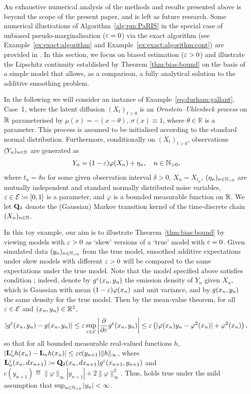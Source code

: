 
An exhaustive numerical analysis of the methods and results presented above is beyond the scope of the present paper, and is left as future research. Some numerical illustrations of Algorithm~\ref{alg:pm:PaRIS} in the special case of unbiased pseudo-marginalisation ($\varepsilon = 0$) via the exact algorithm (see Example~\ref{ex:exact:algorithm} and Example~\ref{ex:exact:algorithm:cont}) are provided in \cite{gloaguen2018online}. In this section, we focus on biased estimation ($\varepsilon > 0$) and illustrate the Lipschitz continuity established by Theorem \ref{thm:bias:bound} on the basis of a simple model that allows, as a comparison, a fully analytical solution to the additive smoothing problem.
 
In the following we will consider an instance of Example~\ref{eq:durham:gallant}, Case~1, where the latent diffusion $(X_t)_{t > 0}$ is an \emph{Ornstein--Uhlenbeck process} \cite{uhlenbeck1930theory} on $\mathbb{R}$ parameterised by $\mu(x) = - (x - \theta)$, $\sigma(x) \equiv 1$,  where $\theta \in \mathbb{R}$ is a parameter.
This process is assumed to be initialised according to the standard normal distribution. Furthermore, conditionally on $(X_t)_{t > 0}$, observations $(Y_n)_{n \in \mathbb{N}}$ are generated as
$$
Y_n = (1 - \varepsilon) \varphi(X_n) + \eta_n, \quad n \in \mathbb{N}_{> 0},
$$
where $t_n = \delta n$ for some given observation interval $\delta > 0$, $X_n = X_{t_n}$, $(\eta_n)_{n \in \mathbb{N}_{> 0}}$ are mutually independent and standard normally distributed noise variables, $\varepsilon \in \mathcal{E} \coloneqq [0, 1]$ is a parameter, and $\varphi$ is a bounded measurable function on $\mathbb{R}$. We let $\mathbf{Q}_\delta$ denote the (Gaussian) Markov transition kernel of the time-discrete chain $(X_n)_{n \in \mathbb{N}}$. 

In this toy example, our aim is to illustrate Theorem~\ref{thm:bias:bound} by viewing models with $\varepsilon > 0$ as `skew' versions of a `true' model with $\varepsilon = 0$. Given simulated data $(y_n)_{n \in \mathbb{N}_{> 0}}$ from the true model, smoothed additive expectations under skew models with different $\varepsilon > 0$ will be compared to the same expectations under the true model. Note that the model specified above satisfies condition ; indeed, denote by $g_{}^\varepsilon(x_n, y_n)$ the emission density of $Y_n$ given $X_n$, which is Gaussian with mean $(1 - \varepsilon) \varphi(x_n)$ and unit variance, and by $g_{}(x_n, y_n)$ the same density for the true model. Then by the mean-value theorem, for all $\varepsilon \in \mathcal{E}$ and $(x_n, y_n) \in \mathbb{R}^2$, 
$$
\left\vert g_{}^\varepsilon(x_n, y_n) - g_{}(x_n, y_n) \right \vert \leq \varepsilon \sup_{\varepsilon \in \mathcal{E}} \left \vert\frac{\partial}{\partial \varepsilon} g_{}^\varepsilon(x_n, y_n) \right\vert 
\leq \varepsilon \left( \vert \varphi(x_n) y_n - \varphi^2(x_n) \vert + \varphi^2(x_n) \right), 
$$
so that for all bounded measurable real-valued functions $h$,  $\vert \mathbf{L}_{n}^\varepsilon h(x_n) - \mathbf{L}_{n} h(x_n) \vert \leq \varepsilon c(y_{n + 1}) \| h\|_\infty$, where $\mathbf{L}_{n}^\varepsilon(x_n, d x_{n + 1}) \coloneqq \mathbf{Q}_\delta(x_n, d x_{n + 1}) g_{}^\varepsilon(x_{n + 1}, y_{n + 1})$ and $c(y_{n + 1}) \eqdef \| \varphi \|_\infty |y_{n + 1}| + 2 \| \varphi \|_\infty^2$. Thus,  holds true under the mild assumption that $\sup_{n \in \mathbb{N}_{> 0}} |y_n| < \infty$. 

